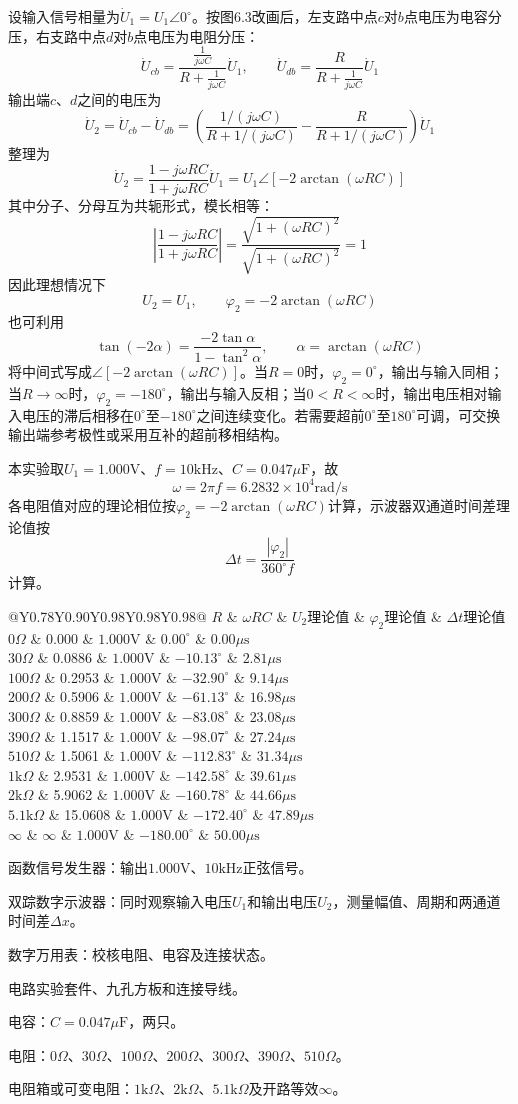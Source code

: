 \documentclass{eleclab-report}
\makeatletter
\newcommand{\ExpSixTableSetup}{%
  \setlength{\tabcolsep}{2.8pt}%
  \renewcommand{\arraystretch}{1.18}%
}
\newcommand{\ExpSixTableFont}{\ElecLabBodyFont\fontsize{9pt}{12pt}\selectfont}
\newcommand{\ExpSixTable}[1]{%
  \begingroup
  \ExpSixTableSetup
  \begin{center}
  {\ExpSixTableFont #1}
  \end{center}
  \endgroup
}
\newcommand{\TheoryValueTable}{%
  \begin{tabularx}{\linewidth}{@{}Y{0.78}Y{0.90}Y{0.98}Y{0.98}Y{0.98}@{}}
    \toprule
    $R$ & $\omega RC$ & $U_2$理论值 & $\varphi_2$理论值 & $\Delta t$理论值 \\
    \midrule
    $0\Omega$ & 0.000 & $1.000\mathrm{V}$ & $0.00^\circ$ & $0.00\mu\mathrm{s}$ \\
    $30\Omega$ & 0.0886 & $1.000\mathrm{V}$ & $-10.13^\circ$ & $2.81\mu\mathrm{s}$ \\
    $100\Omega$ & 0.2953 & $1.000\mathrm{V}$ & $-32.90^\circ$ & $9.14\mu\mathrm{s}$ \\
    $200\Omega$ & 0.5906 & $1.000\mathrm{V}$ & $-61.13^\circ$ & $16.98\mu\mathrm{s}$ \\
    $300\Omega$ & 0.8859 & $1.000\mathrm{V}$ & $-83.08^\circ$ & $23.08\mu\mathrm{s}$ \\
    $390\Omega$ & 1.1517 & $1.000\mathrm{V}$ & $-98.07^\circ$ & $27.24\mu\mathrm{s}$ \\
    $510\Omega$ & 1.5061 & $1.000\mathrm{V}$ & $-112.83^\circ$ & $31.34\mu\mathrm{s}$ \\
    $1\mathrm{k}\Omega$ & 2.9531 & $1.000\mathrm{V}$ & $-142.58^\circ$ & $39.61\mu\mathrm{s}$ \\
    $2\mathrm{k}\Omega$ & 5.9062 & $1.000\mathrm{V}$ & $-160.78^\circ$ & $44.66\mu\mathrm{s}$ \\
    $5.1\mathrm{k}\Omega$ & 15.0608 & $1.000\mathrm{V}$ & $-172.40^\circ$ & $47.89\mu\mathrm{s}$ \\
    $\infty$ & $\infty$ & $1.000\mathrm{V}$ & $-180.00^\circ$ & $50.00\mu\mathrm{s}$ \\
    \bottomrule
  \end{tabularx}%
}
\makeatother
\begin{document}
设输入信号相量为$\dot U_1=U_1\angle0^\circ$。按图6.3改画后，左支路中点$c$对$b$点电压为电容分压，右支路中点$d$对$b$点电压为电阻分压：
\[
  \dot U_{cb}=\frac{\frac{1}{j\omega C}}{R+\frac{1}{j\omega C}}\dot U_1,
  \qquad
  \dot U_{db}=\frac{R}{R+\frac{1}{j\omega C}}\dot U_1
\]
输出端$c$、$d$之间的电压为
\[
  \dot U_2=\dot U_{cb}-\dot U_{db}
  =\left(\frac{1/(j\omega C)}{R+1/(j\omega C)}
  -\frac{R}{R+1/(j\omega C)}\right)\dot U_1
\]
整理为
\[
  \dot U_2=\frac{1-j\omega RC}{1+j\omega RC}\dot U_1
  =U_1\angle\left[-2\arctan(\omega RC)\right]
\]
其中分子、分母互为共轭形式，模长相等：
\[
  \left|\frac{1-j\omega RC}{1+j\omega RC}\right|
  =\frac{\sqrt{1+(\omega RC)^2}}{\sqrt{1+(\omega RC)^2}}=1
\]
因此理想情况下
\[
  U_2=U_1,\qquad \varphi_2=-2\arctan(\omega RC)
\]
也可利用
\[
  \tan(-2\alpha)=\frac{-2\tan\alpha}{1-\tan^2\alpha},
  \qquad \alpha=\arctan(\omega RC)
\]
将中间式写成$\angle[-2\arctan(\omega RC)]$。当$R=0$时，$\varphi_2=0^\circ$，输出与输入同相；当$R\to\infty$时，$\varphi_2=-180^\circ$，输出与输入反相；当$0<R<\infty$时，输出电压相对输入电压的滞后相移在$0^\circ$至$-180^\circ$之间连续变化。若需要超前$0^\circ$至$180^\circ$可调，可交换输出端参考极性或采用互补的超前移相结构。

本实验取$U_1=1.000\mathrm{V}$、$f=10\mathrm{kHz}$、$C=0.047\mu\mathrm{F}$，故
\[
  \omega=2\pi f=6.2832\times10^4\mathrm{rad/s}
\]
各电阻值对应的理论相位按$\varphi_2=-2\arctan(\omega RC)$计算，示波器双通道时间差理论值按
\[
  \Delta t=\frac{|\varphi_2|}{360^\circ f}
\]
计算。
\ExpSixTable{\TheoryValueTable}

\begin{LabArabicList}
  \item 函数信号发生器：输出$1.000\mathrm{V}$、$10\mathrm{kHz}$正弦信号。
  \item 双踪数字示波器：同时观察输入电压$U_1$和输出电压$U_2$，测量幅值、周期和两通道时间差$\Delta x$。
  \item 数字万用表：校核电阻、电容及连接状态。
  \item 电路实验套件、九孔方板和连接导线。
  \item 电容：$C=0.047\mu\mathrm{F}$，两只。
  \item 电阻：$0\Omega$、$30\Omega$、$100\Omega$、$200\Omega$、$300\Omega$、$390\Omega$、$510\Omega$。
  \item 电阻箱或可变电阻：$1\mathrm{k}\Omega$、$2\mathrm{k}\Omega$、$5.1\mathrm{k}\Omega$及开路等效$\infty$。
\end{LabArabicList}
\end{document}
